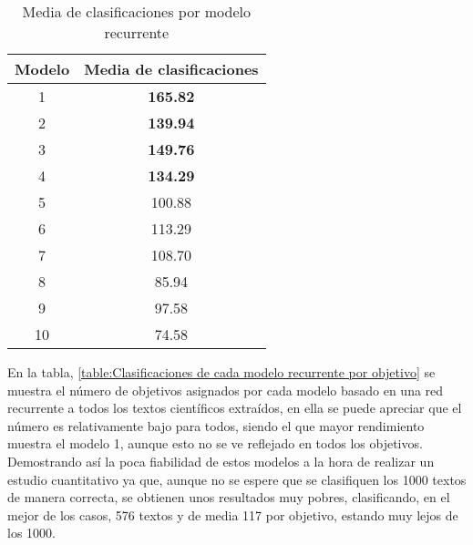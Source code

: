 \begin{table}[H]
    \begin{tabular}{| c | c |}
        \hline
        Modelo & Media de clasificaciones\\
        \hline \hline
        1  & \textbf{165.82}\\ \hline
        2  & \textbf{139.94}\\ \hline
        3  & \textbf{149.76}\\ \hline
        4  & \textbf{134.29}\\ \hline
        5  & 100.88\\ \hline
        6  & 113.29\\ \hline
        7  & 108.70\\ \hline
        8  & 85.94\\ \hline
        9  & 97.58\\ \hline
        10 & 74.58\\ \hline        
    \end{tabular}
    \caption{Media de clasificaciones por modelo recurrente}
    \label{table:Media de clasificaciones por modelo recurrente}
\end{table}

En la tabla, \cref{table:Clasificaciones de cada modelo recurrente por objetivo}
se muestra el número de objetivos asignados por cada modelo basado en una red
recurrente a todos los textos científicos extraídos, en ella se puede apreciar
que el número es relativamente bajo para todos, siendo el que mayor rendimiento
muestra el modelo 1, aunque esto no se ve reflejado en todos los objetivos.
Demostrando así la poca fiabilidad de estos modelos a la hora de realizar un
estudio cuantitativo ya que, aunque no se espere que se clasifiquen los 1000
textos de manera correcta, se obtienen unos resultados muy pobres, clasificando,
en el mejor de los casos, 576 textos y de media 117 por objetivo, estando muy
lejos de los 1000.

